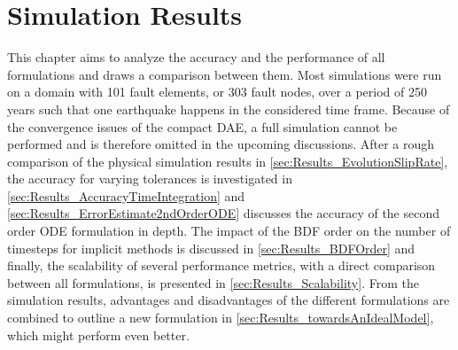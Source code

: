 \chapter{Simulation Results}
\label{chap:Results}

This chapter aims to analyze the accuracy and the performance of all formulations and draws a comparison between them. Most simulations were run on a domain with 101 fault elements, or 303 fault nodes, over a period of 250 years such that one earthquake happens in the considered time frame. Because of the convergence issues of the compact DAE, a full simulation cannot be performed and is therefore omitted in the upcoming discussions. After a rough comparison of the physical simulation results in \autoref{sec:Results_EvolutionSlipRate}, the accuracy for varying tolerances is investigated in \autoref{sec:Results_AccuracyTimeIntegration} and \autoref{sec:Results_ErrorEstimate2ndOrderODE} discusses the accuracy of the second order ODE formulation in depth. The impact of the BDF order on the number of timesteps for implicit methods is discussed in \autoref{sec:Results_BDFOrder} and finally, the scalability of several performance metrics, with a direct comparison between all formulations, is presented in \autoref{sec:Results_Scalability}. From the simulation results, advantages and disadvantages of the different formulations are combined to outline a new formulation in \autoref{sec:Results_towardsAnIdealModel}, which might perform even better.

